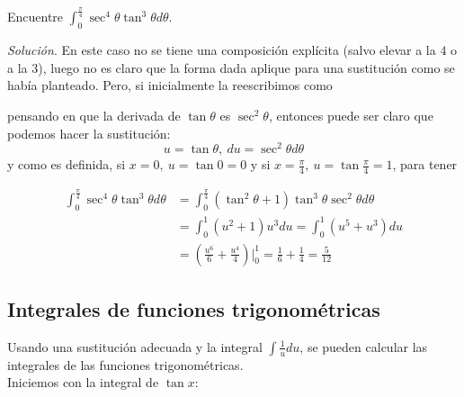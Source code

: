 \begin{ejemplo}
\textnormal{Encuentre} $\displaystyle{\int_{0}^{\frac{\pi }{4}}\sec ^{4}\theta \tan ^{3}\theta d\theta}$.
\end{ejemplo}

\textit{Solución}. En este caso no se tiene una composición explícita (salvo elevar a la $4$ o a la $3$), luego no es claro que la forma dada aplique para una sustitución como se había planteado. Pero, si inicialmente la reescribimos como




pensando en que la derivada de $\tan \theta$ es $\sec^2\theta$, entonces puede ser claro que podemos hacer la sustitución:
\[
u=\tan \theta, \ du=\sec ^{2}\theta d\theta
\]
y como es definida, si $x=0,\ u=\tan 0=0$ y si $x=\frac{\pi }{4},\ u=\tan
\frac{\pi }{4}=1$, para tener

\begin{align*}
\int_{0}^{\frac{\pi }{4}}\sec ^{4}\theta \tan ^{3}\theta d\theta&=\int_{0}^{\frac{\pi }{4}}\left( \tan ^{2}\theta +1\right) \tan ^{3}\theta\sec ^{2}\theta d\theta\\%
&%
=\int_{0}^{1}\left( u^{2}+1\right) u^{3}du=\int_{0}^{1}\left(
u^{5}+u^{3}\right) du \\
&=\left(\frac{u^{6}}{6}+\frac{u^{4}}{4}\right)\Big\vert_{0}^{1} =\frac{1}{6}+\frac{1}{4}=\frac{5}{12}
\end{align*}

\subsection*{Integrales de funciones trigonométricas}

Usando una sustitución adecuada y la integral $\int \frac{1}{u}du$, se pueden calcular las integrales de las funciones trigonométricas.\\

Iniciemos con la integral de $\tan x:$


